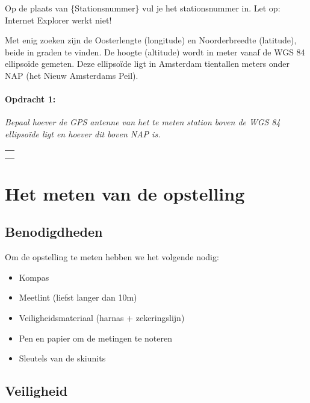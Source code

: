 Op de plaats van \{Stationsnummer\} vul je het stationsnummer in.
Let op: Internet Explorer werkt niet! 

Met enig zoeken zijn de Oosterlengte (longitude) en Noorderbreedte
(latitude), beide in graden te vinden. De hoogte (altitude) wordt
in meter vanaf de WGS 84 ellipsoïde gemeten. Deze ellipsoïde ligt
in Amsterdam tientallen meters onder NAP (het Nieuw Amsterdams Peil).

\begin{minipage}[t]{1\columnwidth}%

\paragraph{Opdracht 1:}

\textit{Bepaal hoever de GPS antenne van het te meten station boven
de WGS 84 ellipsoïde ligt en hoever dit boven NAP is.}

\begin{tabular}{>{\raggedright}p{16.6cm}}
\tabularnewline
\hline 
\tabularnewline
\hline 
\tabularnewline
\hline 
\tabularnewline
\hline 
\end{tabular}%
\end{minipage}

\newpage{}


\section{Het meten van de opstelling}


\subsection{Benodigdheden}

Om de opstelling te meten hebben we het volgende nodig:
\begin{itemize}
\item Kompas
\item Meetlint (liefst langer dan 10m)
\item Veiligheidsmateriaal (harnas + zekeringslijn)
\item Pen en papier om de metingen te noteren
\item Sleutels van de skiunits
\end{itemize}

\subsection{Veiligheid}

